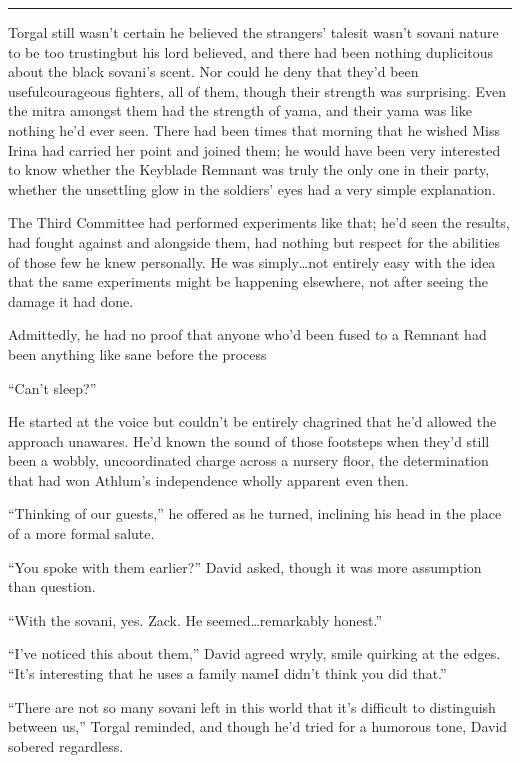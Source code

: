 \fancybreak{\pfbreakdisplay}


Torgal still wasn't certain he believed the strangers' tales\textemdash it wasn't sovani nature to be too trusting\textemdash but his lord believed, and there had been nothing duplicitous about the black sovani's scent. Nor could he deny that they'd been useful\textemdash courageous fighters, all of them, though their strength was surprising. Even the mitra amongst them had the strength of yama, and their yama was like nothing he'd ever seen. There had been times that morning that he wished Miss Irina had carried her point and joined them; he would have been very interested to know whether the Keyblade Remnant was truly the only one in their party, whether the unsettling glow in the soldiers' eyes had a very simple explanation.

The Third Committee had performed experiments like that; he'd seen the results, had fought against and alongside them, had nothing but respect for the abilities of those few he knew personally. He was simply\ldots not entirely easy with the idea that the same experiments might be happening elsewhere, not after seeing the damage it had done.

Admittedly, he had no proof that anyone who'd been fused to a Remnant had been anything like sane before the process\textemdash 

``Can't sleep?''

He started at the voice but couldn't be entirely chagrined that he'd allowed the approach unawares. He'd known the sound of those footsteps when they'd still been a wobbly, uncoordinated charge across a nursery floor, the determination that had won Athlum's independence wholly apparent even then.

``Thinking of our guests,'' he offered as he turned, inclining his head in the place of a more formal salute.

``You spoke with them earlier?'' David asked, though it was more assumption than question.

``With the sovani, yes. Zack. He seemed\ldots remarkably honest.''

``I've noticed this about them,'' David agreed wryly, smile quirking at the edges. ``It's interesting that he uses a family name\textemdash I didn't think you did that.''

``There are not so many sovani left in this world that it's difficult to distinguish between us,'' Torgal reminded, and though he'd tried for a humorous tone, David sobered regardless.

